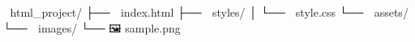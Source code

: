 📂 html_project/
├── 📄 index.html
├── 📂 styles/
│   └── 🎨 style.css
└── 📂 assets/
    └── 📂 images/
        └── 🖼️ sample.png
